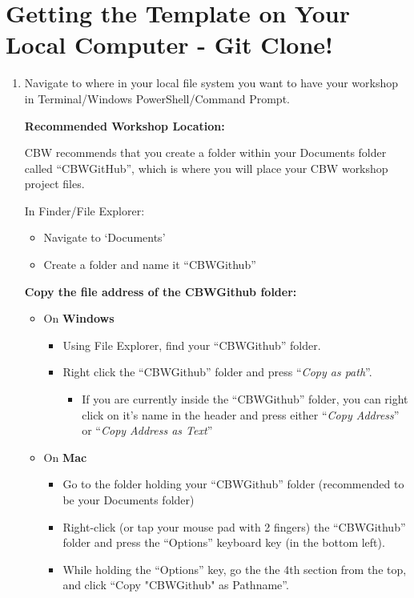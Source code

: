 \documentclass[
]{book}
\providecommand{\tightlist}{%
  \setlength{\itemsep}{0pt}\setlength{\parskip}{0pt}}
\newenvironment{bluebox}{
  \definecolor{shadecolor}{RGB}{172, 210, 237}
  \color{white}
  \begin{shaded}}
 {\end{shaded}}
\theoremstyle{definition}
\theoremstyle{definition}
\theoremstyle{definition}
\theoremstyle{definition}
\theoremstyle{remark}
\begin{document}
\section{Getting the Template on Your Local Computer - Git Clone!}\label{git-clone}

\begin{enumerate}
\def\labelenumi{\arabic{enumi}.}
\item
  Navigate to where in your local file system you want to have your workshop in Terminal/Windows PowerShell/Command Prompt.

  \begin{bluebox}

  \textbf{Recommended Workshop Location:}

  CBW recommends that you create a folder within your Documents folder called ``CBWGitHub'', which is where you will place your CBW workshop project files.

  In Finder/File Explorer:

  \begin{itemize}
  \tightlist
  \item
    Navigate to `Documents'
  \item
    Create a folder and name it ``CBWGithub''
  \end{itemize}

  \textbf{Copy the file address of the CBWGithub folder:}

  \begin{itemize}
  \tightlist
  \item
    On \textbf{Windows}

    \begin{itemize}
    \tightlist
    \item
      Using File Explorer, find your ``CBWGithub'' folder.
    \item
      Right click the ``CBWGithub'' folder and press ``\emph{Copy as path}''.

      \begin{itemize}
      \tightlist
      \item
        If you are currently inside the ``CBWGithub'' folder, you can right click on it's name in the header and press either ``\emph{Copy Address}'' or ``\emph{Copy Address as Text}''
      \end{itemize}
    \end{itemize}
  \item
    On \textbf{Mac}

    \begin{itemize}
    \tightlist
    \item
      Go to the folder holding your ``CBWGithub'' folder (recommended to be your Documents folder)
    \item
      Right-click (or tap your mouse pad with 2 fingers) the ``CBWGithub'' folder and press the ``Options'' keyboard key (in the bottom left).
    \item
      While holding the ``Options'' key, go the the 4th section from the top, and click ``Copy "CBWGithub" as Pathname''.
    \end{itemize}
  \end{itemize}


\end{bluebox}
\end{enumerate}
\end{document}

